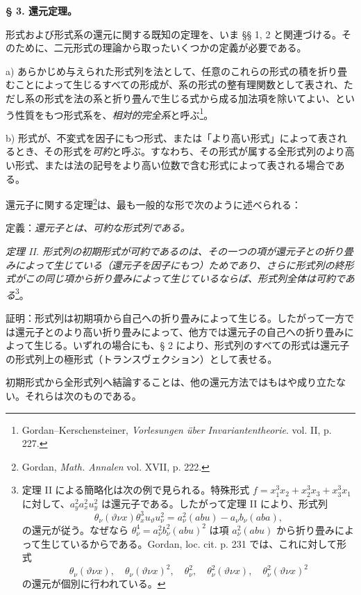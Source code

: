 \documentclass[11pt]{article}
\begin{document}
\begin{center}
\textbf{§ 3. \quad 還元定理。}
\end{center}

形式および形式系の還元に関する既知の定理を、いま §§ 1, 2 と関連づける。そのために、二元形式の理論から取ったいくつかの定義が必要である。

a) あらかじめ与えられた形式列を法として、任意のこれらの形式の積を折り畳むことによって生じるすべての形成が、系の形式の整有理関数として表され、ただし系の形式を法の系と折り畳んで生じる式から成る加法項を除いてよい、という性質をもつ形式系を、\emph{相対的完全系}と呼ぶ\footnote{Gordan--Kerschensteiner, \emph{Vorlesungen über Invariantentheorie}. vol. II, p. 227.}。

b) 形式が、不変式を因子にもつ形式、または「より高い形式」によって表されるとき、その形式を\emph{可約}と呼ぶ。すなわち、その形式が属する全形式列のより高い形式、または法の記号をより高い位数で含む形式によって表される場合である。

還元子に関する定理\footnote{Gordan, \emph{Math. Annalen} vol. XVII, p. 222.}は、最も一般的な形で次のように述べられる：

定義：\emph{還元子とは、可約な形式列である。}

\emph{定理 II. 形式列の初期形式が可約であるのは、その一つの項が還元子との折り畳みによって生じている（還元子を因子にもつ）ためであり、さらに形式列の終形式がこの同じ項から折り畳みによって生じているならば、形式列全体は可約である}\footnote{定理 II による簡略化は次の例で見られる。特殊形式 $f=x_1^3x_2+x_2^3x_3+x_3^3x_1$ に対して、$a_y^2a_x^2u_y^2$ は還元子である。したがって定理 II により、形式列
\[
\theta_\nu(\vartheta\nu x)\theta_x^3u_\vartheta u_\nu^2
=
a_\nu^2(abu)-a_\nu b_\nu(aba),
\]
の還元が従う。なぜなら $\theta_\nu^4=a_\nu^2b_\nu^2(abu)^2$ は項 $a_\nu^2(abu)$ から折り畳みによって生じているからである。Gordan, loc. cit. p. 231 では、これに対して形式
\[
\theta_\nu(\vartheta\nu x),\quad \theta_\nu(\vartheta\nu x)^2,\quad
\theta_\nu^2,\quad \theta_\nu^2(\vartheta\nu x),\quad
\theta_\nu^2(\vartheta\nu x)^2
\]
の還元が個別に行われている。}。

証明：形式列は初期項から自己への折り畳みによって生じる。したがって一方では還元子とのより高い折り畳みによって、他方では還元子の自己への折り畳みによって生じる。いずれの場合にも、§ 2 により、形式列のすべての形式は還元子の形式列上の極形式（トランスヴェクション）として表せる。

初期形式から全形式列へ結論することは、他の還元方法ではもはや成り立たない。それらは次のものである。
\end{document}
